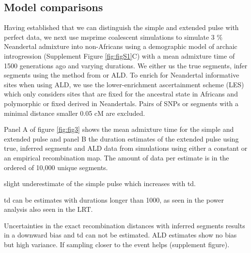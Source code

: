 \documentclass[11pt]{article}
\begin{document}
\subsection{Model comparisons}\label{Model comparison}

Having established that we can distinguish the simple and extended pulse with perfect data, we next use msprime coalescent simulations to simulate 3 \% Neandertal admixture into non-Africans using a demographic model of archaic introgression (Supplement Figure \ref{fig:figS1}C) with a mean admixture time of 1500 generations ago and varying durations. We either us the true segments, infer segments using the method from \cite{skov_detecting_2018} or ALD. To enrich for Neandertal informative sites when using ALD, we use the lower-enrichment ascertainment scheme (LES)  which only considers sites that are fixed for the ancestral state in Africans and polymorphic or fixed derived in Neandertals. Pairs of SNPs or segments with a minimal distance smaller 0.05 cM are excluded.

Panel A of figure \ref{fig:fig3} shows the mean admixture time for the simple and extended pulse and panel B the duration estimates of the extended pulse using true, inferred segments and ALD data from simulations using either a constant or an empirical recombination map.
The amount of data per estimate is in the ordered of 10,000 unique segments. 

slight underestimate of the simple pulse which increases with td.

td can be estimates with durations longer than 1000, as seen in the power analysis also seen in the LRT.

Uncertainties in the exact recombination distances with inferred segments results in a downward bias and td can not be estimated. ALD estimates show no bias but high variance. If sampling closer to the event helps (supplement figure).
\end{document}
